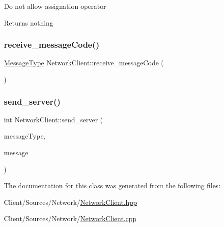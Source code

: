 Do not allow assignation operator \begin{DoxyReturn}{Returns}
nothing 
\end{DoxyReturn}
\mbox{\label{classNetworkClient_a7d56a3333337b04ec557f0655bebcb28}} 
\subsubsection{\texorpdfstring{receive\+\_\+message\+Code()}{receive\_messageCode()}}
{\footnotesize\ttfamily \hyperlink{NetworkInterface_8hpp_a36cbd2fb6499765a19ee1942d46c9f1f}{Message\+Type} Network\+Client\+::receive\+\_\+message\+Code (\begin{DoxyParamCaption}{ }\end{DoxyParamCaption})}

\mbox{\label{classNetworkClient_afd8376b194f595c16119c695fd875028}} 
\subsubsection{\texorpdfstring{send\+\_\+server()}{send\_server()}}
{\footnotesize\ttfamily int Network\+Client\+::send\+\_\+server (\begin{DoxyParamCaption}\item[{\hyperlink{NetworkInterface_8hpp_a36cbd2fb6499765a19ee1942d46c9f1f}{Message\+Type}}]{message\+Type,  }\item[{std\+::string}]{message }\end{DoxyParamCaption})}



The documentation for this class was generated from the following files\+:\begin{DoxyCompactItemize}
\item 
Client/\+Sources/\+Network/\hyperlink{Client_2Sources_2Network_2NetworkClient_8hpp}{Network\+Client.\+hpp}\item 
Client/\+Sources/\+Network/\hyperlink{Client_2Sources_2Network_2NetworkClient_8cpp}{Network\+Client.\+cpp}\end{DoxyCompactItemize}
